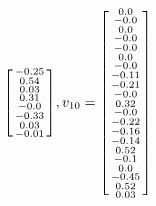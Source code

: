 \documentclass[a4paper,hidelinks,14pt]{extarticle}
\begin{document}
$$\begin{bsmallmatrix}
		-0.25\\
		0.54\\ 
		0.03\\ 
		0.31\\ 
		-0.0\\ 
		-0.33\\
		0.03\\ 
		-0.01\\
	\end{bsmallmatrix},
		v_{10}=\begin{bsmallmatrix}
		0.0\\   -
		0.0\\   
		0.0\\   
		-0.0\\   
		-0.0\\  
		0.0\\   
		-0.0\\   
		-0.11\\ 
		-0.21\\
		-0.0\\   
		0.32\\  
		-0.0\\   
		-0.22\\
		-0.16\\
		-0.14\\ 
		0.52\\  
		-0.1\\  
		0.0\\   
		-0.45\\
		0.52\\  
		0.03\\
	\end{bsmallmatrix}
	$$
\end{document}
